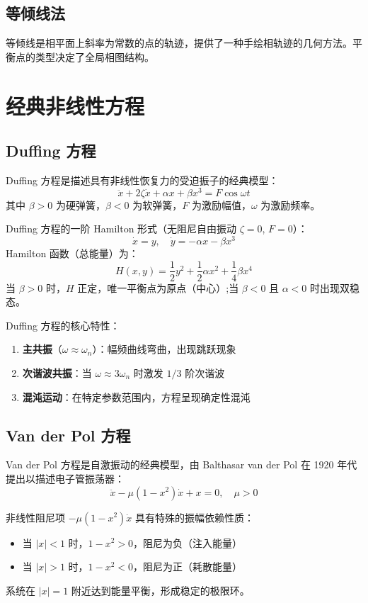 \subsection{等倾线法}
等倾线是相平面上斜率为常数的点的轨迹，提供了一种手绘相轨迹的几何方法。平衡点的类型决定了全局相图结构。

\section{经典非线性方程}
\subsection{Duffing 方程}
Duffing 方程是描述具有非线性恢复力的受迫振子的经典模型：
\[
\ddot{x} + 2\zeta\dot{x} + \alpha x + \beta x^{3} = F\cos\omega t
\]
其中 $\beta > 0$ 为硬弹簧，$\beta < 0$ 为软弹簧，$F$ 为激励幅值，$\omega$ 为激励频率。

\begin{myformula}
Duffing 方程的一阶 Hamilton 形式（无阻尼自由振动 $\zeta=0$, $F=0$）：
\[
\dot{x} = y, \quad \dot{y} = -\alpha x - \beta x^{3}
\]
Hamilton 函数（总能量）为：
\[
H(x,y) = \frac{1}{2}y^{2} + \frac{1}{2}\alpha x^{2} + \frac{1}{4}\beta x^{4}
\]
当 $\beta>0$ 时，$H$ 正定，唯一平衡点为原点（中心）;当 $\beta<0$ 且 $\alpha<0$ 时出现双稳态。
\end{myformula}

Duffing 方程的核心特性：
\begin{enumerate}
    \item \textbf{主共振}（$\omega \approx \omega_n$）：幅频曲线弯曲，出现跳跃现象
    \item \textbf{次谐波共振}：当 $\omega \approx 3\omega_n$ 时激发 $1/3$ 阶次谐波
    \item \textbf{混沌运动}：在特定参数范围内，方程呈现确定性混沌
\end{enumerate}

\subsection{Van der Pol 方程}
Van der Pol 方程是自激振动的经典模型，由 Balthasar van der Pol 在 1920 年代提出以描述电子管振荡器：
\[
\ddot{x} - \mu(1-x^{2})\dot{x} + x = 0, \quad \mu > 0
\]

\begin{definition}
非线性阻尼项 $-\mu(1-x^{2})\dot{x}$ 具有特殊的振幅依赖性质：
\begin{itemize}
    \item 当 $|x| < 1$ 时，$1-x^{2} > 0$，阻尼为负（注入能量）
    \item 当 $|x| > 1$ 时，$1-x^{2} < 0$，阻尼为正（耗散能量）
\end{itemize}
系统在 $|x|=1$ 附近达到能量平衡，形成稳定的极限环。
\end{definition}

